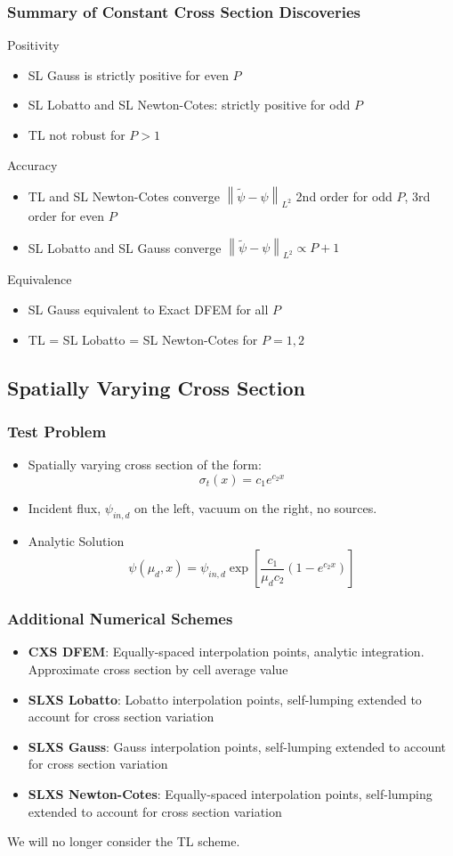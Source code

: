 \documentclass{beamer}
\newcommand{\be}{\begin{equation*}}   %
\newcommand{\ee}{\end{equation*}}
\newcommand{\norm}[1]{\ensuremath{\left\lVert #1 \right\rVert}}  %
\begin{document}
\begin{frame}
\frametitle{Summary of Constant Cross Section Discoveries}
Positivity
\begin{itemize}
\item SL Gauss is strictly positive for even $P$
\item SL Lobatto and SL Newton-Cotes: strictly positive for odd $P$
\item TL not robust for $P>1$
\end{itemize}
Accuracy
\begin{itemize}
\item TL and SL Newton-Cotes converge $\norm{ \widetilde{\psi} - \psi }_{L^2} $ 2nd order for odd $P$, 3rd order for even $P$
\item SL Lobatto and SL Gauss converge $\norm{ \widetilde{\psi} - \psi }_{L^2} \propto P+1$
\end{itemize}
Equivalence
\begin{itemize}
\item SL Gauss equivalent to Exact DFEM for all $P$
\item TL = SL Lobatto = SL Newton-Cotes for $P=1,2$
\end{itemize}
\end{frame}

\subsection{Spatially Varying Cross Section}

\begin{frame}
\frametitle{Test Problem}
\begin{itemize}
\item Spatially varying cross section of the form:
\be
\sigma_t(x) = c_1 e^{c_2 x}
\ee
\item Incident flux, $\psi_{in,d}$ on the left, vacuum on the right, no sources.
\item Analytic Solution
\be
\psi(\mu_d,x) = \psi_{in,d}\exp\left[ \frac{c_1 }{\mu_d c_2 } \left(1- e^{c_2 x}  \right) \right] 
\ee
\end{itemize}
\end{frame}

\begin{frame}
\frametitle{Additional Numerical Schemes}
\begin{itemize}
\item {\bf CXS DFEM}: Equally-spaced interpolation points, analytic integration.  Approximate cross section by cell average value
\item {\bf SLXS Lobatto}: Lobatto interpolation points, self-lumping extended to account for cross section variation
\item {\bf SLXS Gauss}: Gauss interpolation points, self-lumping extended to account for cross section variation
\item {\bf SLXS Newton-Cotes}: Equally-spaced interpolation points, self-lumping extended to account for cross section variation
\end{itemize}
We will no longer consider the TL scheme.
\end{frame}
\end{document}
